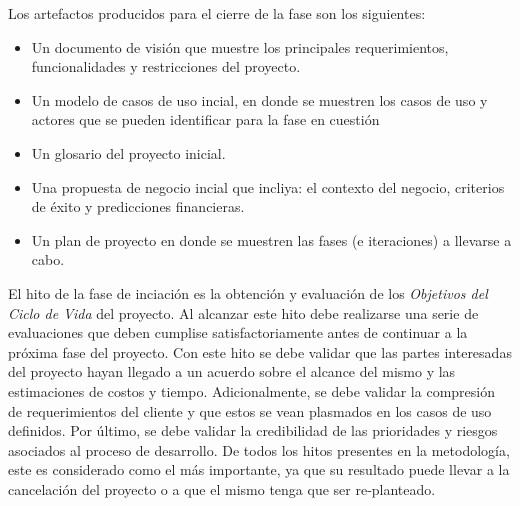 Los artefactos producidos para el cierre de la fase son los siguientes:

\begin{itemize}
\item Un documento de visión que muestre los principales requerimientos, funcionalidades y restricciones del proyecto.
\item Un modelo de casos de uso incial, en donde se muestren los casos de uso y actores que se pueden identificar para la fase en cuestión
\item Un glosario del proyecto inicial.
\item Una propuesta de negocio incial que incliya: el contexto del negocio, criterios de éxito y predicciones financieras.
\item Un plan de proyecto en donde se muestren las fases (e iteraciones) a llevarse a cabo.
\end{itemize}

El hito de la fase de inciación es la obtención y evaluación de los \textit{Objetivos del Ciclo de Vida} del proyecto. Al alcanzar este hito debe realizarse una serie de evaluaciones que deben cumplise satisfactoriamente antes de continuar a la próxima fase del proyecto. Con este hito se debe validar que las partes interesadas del proyecto hayan llegado a un acuerdo sobre el alcance del mismo y las estimaciones de costos y tiempo. Adicionalmente, se debe validar la compresión de requerimientos del cliente y que estos se vean plasmados en los casos de uso definidos. Por último, se debe validar la credibilidad de las prioridades y riesgos asociados al proceso de desarrollo.
De todos los hitos presentes en la metodología, este es considerado como el más importante, ya que su resultado puede llevar a la cancelación del proyecto o a que el mismo tenga que ser re-planteado.
